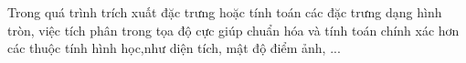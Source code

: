 \documentclass[preview]{standalone}
\begin{document}
\begin{center}
Trong quá trình trích xuất đặc trưng hoặc tính toán các đặc trưng dạng hình tròn, việc tích phân trong tọa độ cực giúp chuẩn hóa và tính toán chính xác hơn các thuộc tính hình học,như diện tích, mật độ điểm ảnh, ...
\end{center}
\end{document}
